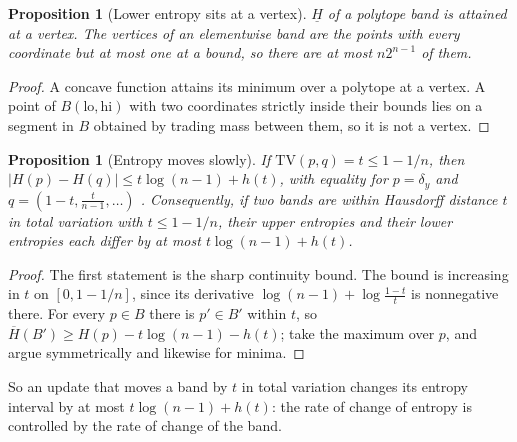 \documentclass[11pt]{article}
\newtheorem{proposition}[theorem]{Proposition}
\theoremstyle{definition}
\theoremstyle{remark}
\newcommand{\TV}{\mathrm{TV}}
\newcommand{\Hup}{\overline{H}}
\newcommand{\Hlo}{\underline{H}}
\begin{document}
\begin{proposition}[Lower entropy sits at a vertex]\label{prop:lower}
$\Hlo$ of a polytope band is attained at a vertex. The vertices of an elementwise band are the points with every coordinate but
at most one at a bound, so there are at most $n2^{n-1}$ of them.
\end{proposition}
\begin{proof}
A concave function attains its minimum over a polytope at a vertex. A point of $B(\mathrm{lo},\mathrm{hi})$ with two coordinates
strictly inside their bounds lies on a segment in $B$ obtained by trading mass between them, so it is not a vertex.
\end{proof}

\begin{proposition}[Entropy moves slowly]\label{prop:entropyspeed}
If $\TV(p,q)=t\le1-1/n$, then $\lvert H(p)-H(q)\rvert\le t\log(n-1)+h(t)$, with equality for $p=\delta_y$ and
$q=(1-t,\frac t{n-1},\dots)$ \cite{Zhang2007,Audenaert2007}. Consequently, if two bands are within Hausdorff distance $t$ in total
variation with $t\le1-1/n$, their upper entropies and their lower entropies each differ by at most $t\log(n-1)+h(t)$.
\end{proposition}
\begin{proof}
The first statement is the sharp continuity bound. The bound is increasing in $t$ on $[0,1-1/n]$, since its derivative
$\log(n-1)+\log\frac{1-t}t$ is nonnegative there. For every $p\in B$ there is $p'\in B'$ within $t$, so
$\Hup(B')\ge H(p)-t\log(n-1)-h(t)$; take the maximum over $p$, and argue symmetrically and likewise for minima.
\end{proof}

So an update that moves a band by $t$ in total variation changes its entropy interval by at most $t\log(n-1)+h(t)$: the rate of
change of entropy is controlled by the rate of change of the band.
\end{document}
